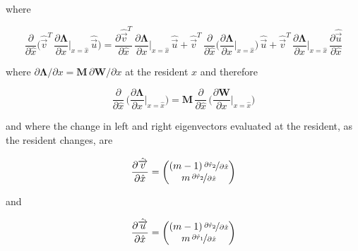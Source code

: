 where

\begin{equation}
    \frac{\partial}{\partial \hat{x}} \bigg( \hat{\overrightarrow{v}}^T\,\frac{\partial \pmb{\Lambda}}{\partial x}\bigg|_{x=\hat{x}}\,\hat{\overrightarrow{u}} \bigg) = \frac{\partial \hat{\overrightarrow{v}}^T}{\partial \hat{x}}\,\frac{\partial \pmb{\Lambda}}{\partial x}\bigg|_{x=\hat{x}}\,\hat{\overrightarrow{u}} + \hat{\overrightarrow{v}}^T\,\frac{\partial}{\partial \hat{x}} \bigg(\frac{\partial \pmb{\Lambda}}{\partial x}\bigg|_{x=\hat{x}}\bigg)\,\hat{\overrightarrow{u}} + \hat{\overrightarrow{v}}^T\,\frac{\partial \pmb{\Lambda}}{\partial x}\bigg|_{x=\hat{x}}\,\frac{\partial \hat{\overrightarrow{u}}}{\partial \hat{x}}
\end{equation}

where $\partial \pmb \Lambda / \partial x = \pmb M \, \partial \pmb W / \partial x$ at the resident $\hat x$ and therefore

\begin{equation}
    \frac{\partial}{\partial \hat x}\,\bigg(\frac{\partial \pmb \Lambda}{\partial x}\bigg|_{x=\hat x}\bigg) = \pmb M \, \frac{\partial}{\partial \hat x}\,\bigg(\frac{\partial \pmb W}{\partial x}\bigg|_{x=\hat x}\bigg)
\end{equation}

and where the change in left and right eigenvectors evaluated at the resident, as the resident changes, are

\begin{equation}
    \frac{\partial \hat{\overrightarrow{v}} }{\partial \hat x} = 
    \begin{pmatrix}
        (m-1)\,\nicefrac{\partial \hat r_2}{\partial \hat x}\\
        m\,\nicefrac{\partial \hat r_2}{\partial \hat x}
    \end{pmatrix}
    \label{eq:deriv_left_eigenvector_resident}
\end{equation}

and

\begin{equation}
    \frac{\partial \hat{\overrightarrow{u}} }{\partial \hat x} = 
    \begin{pmatrix}
        (m-1)\,\nicefrac{\partial \hat r_2}{\partial \hat x}\\
        m\,\nicefrac{\partial \hat r_1}{\partial \hat x}
    \end{pmatrix}
    \label{eq:deriv_right_eigenvector_resident}
\end{equation}

